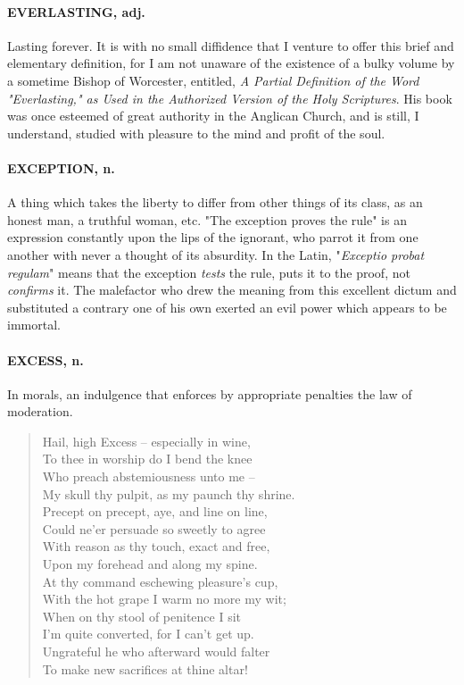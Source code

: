 \documentclass[11pt]{article}
\begin{document}
\paragraph{EVERLASTING, adj.}  Lasting forever.  It is with no small diffidence
that I venture to offer this brief and elementary definition, for I am
not unaware of the existence of a bulky volume by a sometime Bishop of
Worcester, entitled, {\em A Partial Definition of the Word "Everlasting,"
as Used in the Authorized Version of the Holy Scriptures}.  His book
was once esteemed of great authority in the Anglican Church, and is
still, I understand, studied with pleasure to the mind and profit of
the soul.

\paragraph{EXCEPTION, n.}  A thing which takes the liberty to differ from other
things of its class, as an honest man, a truthful woman, etc.  "The
exception proves the rule" is an expression constantly upon the lips
of the ignorant, who parrot it from one another with never a thought
of its absurdity.  In the Latin, "{\em Exceptio probat regulam}" means
that the exception {\em tests} the rule, puts it to the proof, not
{\em confirms} it.  The malefactor who drew the meaning from this
excellent dictum and substituted a contrary one of his own exerted an
evil power which appears to be immortal.

\paragraph{EXCESS, n.}  In morals, an indulgence that enforces by appropriate
penalties the law of moderation.

\begin{quote}   Hail, high Excess -- especially in wine, \\
      To thee in worship do I bend the knee \\
      Who preach abstemiousness unto me -- \\
  My skull thy pulpit, as my paunch thy shrine. \\
  Precept on precept, aye, and line on line, \\
      Could ne'er persuade so sweetly to agree \\
      With reason as thy touch, exact and free, \\
  Upon my forehead and along my spine. \\
  At thy command eschewing pleasure's cup, \\
      With the hot grape I warm no more my wit; \\
      When on thy stool of penitence I sit \\
  I'm quite converted, for I can't get up. \\
  Ungrateful he who afterward would falter \\
  To make new sacrifices at thine altar!  \end{quote}
\end{document}
